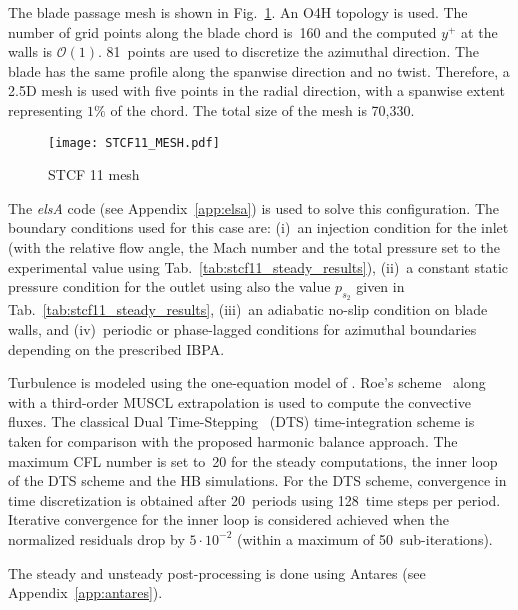 
The blade passage mesh is shown in Fig.~\ref{fig:stcf11_mesh}.
An O4H topology is used.
The number of grid points along the blade
chord is~160 and the computed $y^+$ at the walls is $\mathcal{O}(1)$.
81~points are used to discretize the azimuthal direction.
The blade has the same profile along the spanwise direction and no
twist. Therefore, a 2.5D mesh is used with five points 
in the radial direction, with a spanwise
extent representing $1\%$ of the chord. 
The total size of the mesh is 70,330.
\begin{figure}[htp]
  \centering
  \texttt{[image: STCF11\_MESH.pdf]}
  \caption{STCF 11 mesh}
  \label{fig:stcf11_mesh}
\end{figure}

The \emph{elsA} code (see Appendix~\ref{app:elsa}) is used 
to solve this configuration.
The boundary conditions used for this case are: (i)~an
injection condition  for the inlet (with the relative flow angle,
the Mach number and the total pressure
set to the experimental value using Tab.~\ref{tab:stcf11_steady_results}), 
(ii)~a constant static pressure
condition for the outlet using also the value $p_{s_2}$
given in Tab.~\ref{tab:stcf11_steady_results},  
(iii)~an adiabatic no-slip condition on
blade walls, and (iv)~periodic or phase-lagged conditions 
for azimuthal boundaries depending on the  
prescribed IBPA.

Turbulence is modeled using the one-equation model of
\citet{Spalart1992}.  Roe's scheme~\cite{Roe1981} along with a 
third-order MUSCL extrapolation 
is used to compute the convective fluxes.
The classical Dual Time-Stepping~\cite{Jameson1981} (DTS)
time-integration scheme is taken for comparison with the
proposed harmonic balance approach.
The maximum
CFL number is set to~20 for the steady computations,  the inner loop
of the DTS scheme and the HB simulations.  For the DTS scheme,  
convergence in time discretization is obtained
after 20~periods using 128~time steps per period.  Iterative convergence 
for the inner loop is considered achieved when the normalized
residuals drop by $5\cdot 10^{-2}$ (within a maximum of
50~sub-iterations).

The steady and unsteady post-processing is done using 
Antares (see Appendix~\ref{app:antares}).

